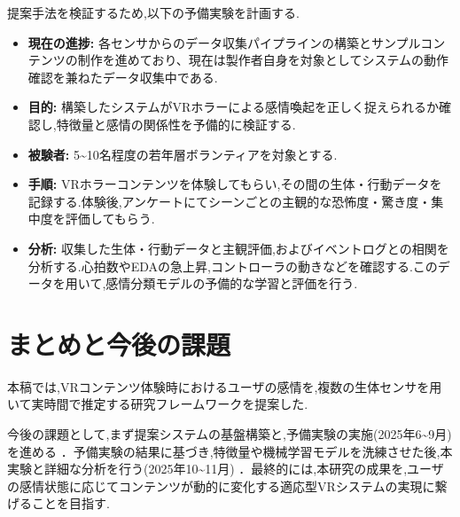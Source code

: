 \documentclass[a4paper]{jarticle}
\begin{document}
提案手法を検証するため,以下の予備実験を計画する.

\begin{itemize}
    \item \textbf{現在の進捗:} 各センサからのデータ収集パイプラインの構築とサンプルコンテンツの制作を進めており、現在は製作者自身を対象としてシステムの動作確認を兼ねたデータ収集中である.
    \item \textbf{目的:} 構築したシステムがVRホラーによる感情喚起を正しく捉えられるか確認し,特徴量と感情の関係性を予備的に検証する.
    \item \textbf{被験者:} 5\textasciitilde10名程度の若年層ボランティアを対象とする.
    \item \textbf{手順:} VRホラーコンテンツを体験してもらい,その間の生体・行動データを記録する.体験後,アンケートにてシーンごとの主観的な恐怖度・驚き度・集中度を評価してもらう.
    \item \textbf{分析:} 収集した生体・行動データと主観評価,およびイベントログとの相関を分析する.心拍数やEDAの急上昇,コントローラの動きなどを確認する.このデータを用いて,感情分類モデルの予備的な学習と評価を行う.
\end{itemize}

\section{まとめと今後の課題}

本稿では,VRコンテンツ体験時におけるユーザの感情を,複数の生体センサを用いて実時間で推定する研究フレームワークを提案した.

今後の課題として,まず提案システムの基盤構築と,予備実験の実施(2025年6\textasciitilde9月)を進める ．予備実験の結果に基づき,特徴量や機械学習モデルを洗練させた後,本実験と詳細な分析を行う(2025年10\textasciitilde11月) ．最終的には,本研究の成果を,ユーザの感情状態に応じてコンテンツが動的に変化する適応型VRシステムの実現に繋げることを目指す.
\end{document}
